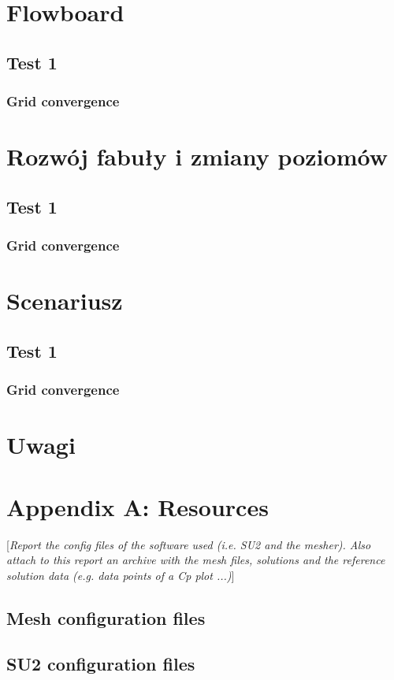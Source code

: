 \documentclass[11pt,polish, openany]{book}
\begin{document}
\chapter{Flowboard}\label{chapt:results}
\section{Test 1}
\subsection{Grid convergence}

\chapter{Rozwój fabuły i zmiany poziomów}\label{chapt:results}
\section{Test 1}
\subsection{Grid convergence}

\chapter{Scenariusz}\label{chapt:results}
\section{Test 1}
\subsection{Grid convergence}
\chapter{Uwagi}

\pagebreak





\pagebreak

\chapter*{Appendix A: Resources}
[\textit{Report the config files of the software used (i.e. SU2 \cite{economon2015su2} and the mesher). Also attach to this report an archive with the mesh files, solutions and the reference solution data (e.g. data points of a Cp plot ...)}]
\section*{Mesh configuration files}
\section*{SU2 configuration files}
\end{document}
